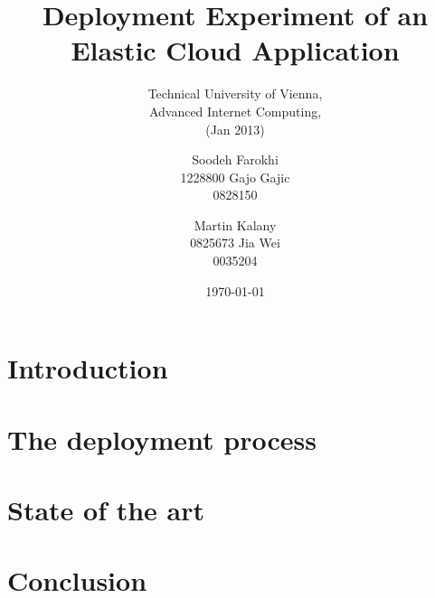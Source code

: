 \documentclass{sig-alternate}
\begin{document}
\title{Deployment Experiment of an Elastic Cloud Application}
\subtitle{Technical University of Vienna,\\Advanced Internet Computing,\\
(Jan 2013)}


\author{
\alignauthor
Soodeh Farokhi\\ %
       1228800
\alignauthor
Gajo Gajic\\
       0828150
\and
\alignauthor
Martin Kalany\\
       0825673
\alignauthor
Jia Wei\\
       0035204
}
       
\date{\today}

\maketitle
\begin{abstract}
\end{abstract}

\section{Introduction}

\section{The deployment process}


\section{State of the art}

\section{Conclusion}


 
\end{document}
